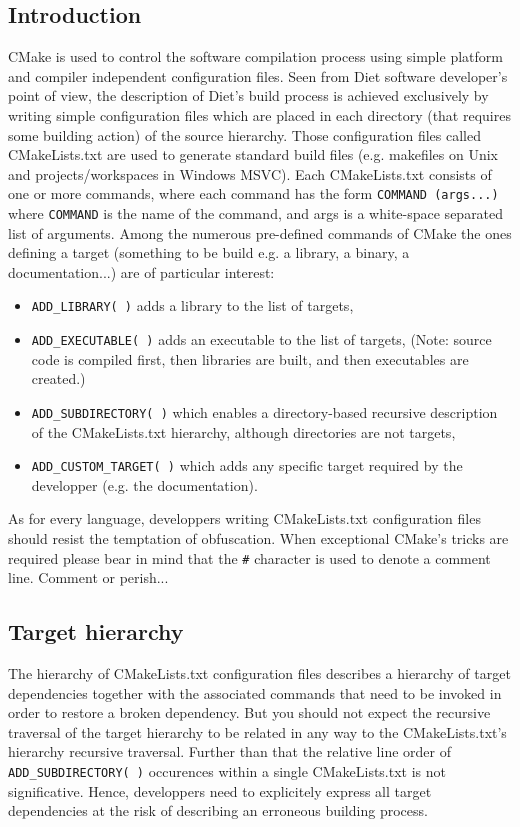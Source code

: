 \subsection{Introduction}
CMake is used to control the software compilation process using simple platform
and compiler independent configuration files.
Seen from Diet software developer's point of view, the description of
Diet's build process is achieved exclusively by writing simple configuration
files which are placed in each directory (that requires some building action)
of the source hierarchy.
Those configuration files called CMakeLists.txt are used to generate standard
build files (e.g. makefiles on Unix and projects/workspaces in Windows MSVC).
Each CMakeLists.txt consists of one or more commands, where each command
has the form \texttt{COMMAND (args...)} where \texttt{COMMAND} is the name
of the command, and args is a white-space separated list of arguments.
Among the numerous pre-defined commands of CMake the ones defining a target
(something to be build e.g. a library, a binary, a documentation...) are of
particular interest:
\begin{itemize}
\item \texttt{ADD\_LIBRARY( )} adds a library to the list of targets,
\item \texttt{ADD\_EXECUTABLE( )} adds an executable to the list of targets,
      (Note: source code is compiled first, then libraries are built, and
       then executables are created.)
\item \texttt{ADD\_SUBDIRECTORY( )} which enables a directory-based recursive
      description of the CMakeLists.txt hierarchy, although directories are
      not targets,
\item \texttt{ADD\_CUSTOM\_TARGET( )} which adds any specific target required
      by the developper (e.g. the documentation).
\end{itemize}
As for every language, developpers writing CMakeLists.txt configuration
files should resist the temptation of obfuscation. When exceptional
CMake's tricks are required please bear in mind that the \texttt{\#}
character is used to denote a comment line. Comment or perish...

\subsection{Target hierarchy}
The hierarchy of CMakeLists.txt configuration files describes a hierarchy
of target dependencies together with the associated commands that need to be
invoked in order to restore a broken dependency.
But you should not expect the recursive traversal of the target
hierarchy to be related in any way to the CMakeLists.txt's hierarchy
recursive traversal.
Further than that the relative line order of \texttt{ADD\_SUBDIRECTORY( )}
occurences within a single CMakeLists.txt is not significative.
Hence, developpers need to explicitely express all target dependencies 
at the risk of describing an erroneous building process.

